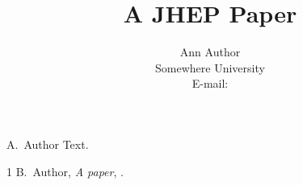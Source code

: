 \documentclass{JHEP3}
\title{A JHEP Paper}
\author{Ann Author\\ Somewhere University\\ E-mail: \email{ann@x.org}}
\begin{document}
\makeatletter\setbox\@firstaubox\hbox{A. Author}\makeatother
Text.
\begin{thebibliography}{1}
 B.~Author, \emph{A paper}, .
\end{thebibliography}
\end{document}

